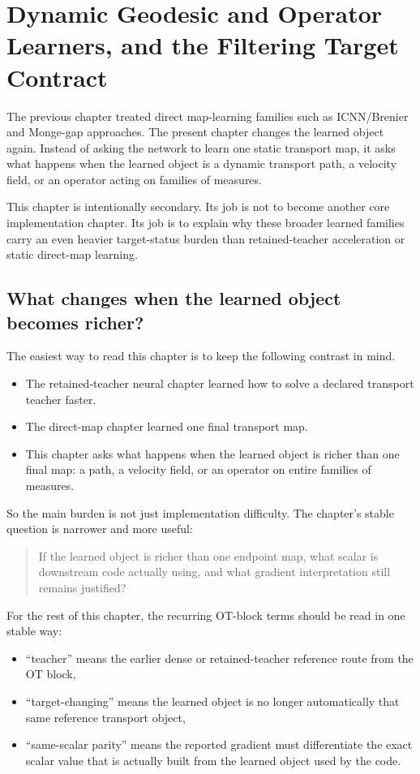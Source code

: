 \chapter{Dynamic Geodesic and Operator Learners, and the Filtering Target Contract}
\label{ch:bf-neural-ot-dynamic-target-contract}

The previous chapter treated direct map-learning families such as ICNN/Brenier
and Monge-gap approaches.  The present chapter changes the learned object again.
Instead of asking the network to learn one static transport map, it asks what
happens when the learned object is a dynamic transport path, a velocity field, or
an operator acting on families of measures.

This chapter is intentionally secondary.  Its job is not to become another core
implementation chapter.  Its job is to explain why these broader learned families
carry an even heavier target-status burden than retained-teacher acceleration or
static direct-map learning.

\section{What changes when the learned object becomes richer?}
\label{sec:bf-neural-ot-dynamic-orientation}

The easiest way to read this chapter is to keep the following contrast in mind.
\begin{itemize}
  \item The retained-teacher neural chapter learned how to solve a declared
  transport teacher faster.
  \item The direct-map chapter learned one final transport map.
  \item This chapter asks what happens when the learned object is richer than one
  final map: a path, a velocity field, or an operator on entire families of
  measures.
\end{itemize}

So the main burden is not just implementation difficulty.  The chapter's stable
question is narrower and more useful:
\begin{quote}
If the learned object is richer than one endpoint map, what scalar is downstream
code actually using, and what gradient interpretation still remains justified?
\end{quote}
For the rest of this chapter, the recurring OT-block terms should be read in one
stable way:
\begin{itemize}
  \item ``teacher'' means the earlier dense or retained-teacher reference route from
  the OT block,
  \item ``target-changing'' means the learned object is no longer automatically that
  same reference transport object,
  \item ``same-scalar parity'' means the reported gradient must differentiate the
  exact scalar value that is actually built from the learned object used by the
  code.
\end{itemize}

